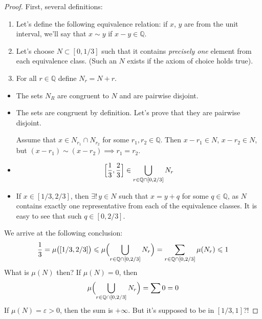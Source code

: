 \begin{proof}
    First, several definitions:
    \begin{enumerate}[label={Step \arabic*.}]
        \item {
            Let's define the following equivalence relation:
            if $x$, $y$ are from the unit interval, we'll say that
            $x \sim y$ if $x - y \in \mathbb{Q}$.
        }
        \item {
            Let's choose $N \subset [0, 1/3]$ such that it contains
            \textit{precisely one} element from each equivalence class.
            (Such an $N$ exists if the axiom of choice holds true).
        }
        \item {
            For all $r \in \mathbb{Q}$ define $N_r = N + r$.
        }
    \end{enumerate}

    \begin{itemize}%
        \item[Claim 1.] {
            The sets $N_R$ are congruent to $N$ and are pairwise disjoint.
        }
        \item[Proof.] {
            The sets are congruent by definition. Let's prove that 
            they are pairwise disjoint.

            Assume that $x \in N_{r_1} \cap N_{r_2}$ for some
            $r_1, r_2 \in \mathbb{Q}$.
            Then $x - r_1 \in N$, $x - r_2 \in N$, but
            $(x - r_1) \sim (x - r_2) \implies r_1 = r_2$.
        }
        \item[Claim 2.] {
            \[
                \Bigl[\frac{1}{3}, \frac{2}{3}\Bigr] \in
                \bigcup_{r \in \mathbb{Q} \cap [0, 2/3]} N_r
            \]
        }
        \item[Proof.] {
            If $x \in [1/3, 2/3]$, then
            $\exists!\, y \in N$ such that $x = y + q$ for some $q \in \mathbb{Q}$,
            as $N$ contains exactly one representative from each of the equivalence classes.
            It is easy to see that such $q \in [0, 2/3]$.
        }
    \end{itemize}

    We arrive at the following conclusion:
    \[
        \frac{1}{3} = \mu\bigl([1/3, 2/3]\bigr) \le \mu\Bigl( \bigcup_{r \in \mathbb{Q} \cap [0, 2/3]} N_r \Bigr) = 
        \sum_{r \in \mathbb{Q} \cap [0, 2/3]} \mu(N_r) \le 1
    \]
    What is $\mu(N)$ then? If $\mu(N) = 0$, then 
    \[
        \mu\Bigl( \bigcup_{r \in \mathbb{Q} \cap [0, 2/3]} N_r \Bigr) = 
        \sum 0 = 0
    \]
    If $\mu(N) = \varepsilon > 0$, then the sum is $+\infty$. 
    But it's supposed to be in $[1/3, 1]$?!
\end{proof}


